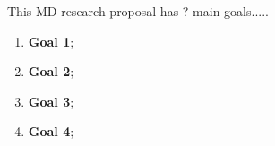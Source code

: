 This MD research proposal has ? main goals.....


\begin{enumerate}
	\item \textbf{Goal 1};
	
	\item \textbf{Goal 2};
	
	\item \textbf{Goal 3};
	
	\item \textbf{Goal 4};
	
\end{enumerate}